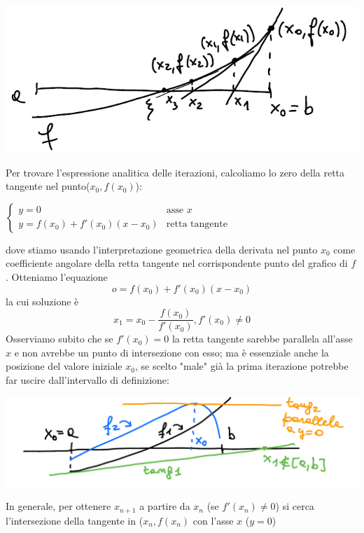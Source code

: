 \documentclass[12pt]{article}
\begin{document}
\begin{center}
    \includegraphics[scale=0.5]{pagina5_1.png}
\end{center}
Per trovare l'espressione analitica delle iterazioni, calcoliamo lo zero della retta tangente nel punto($x_0,f(x_0)$):
\begin{center}
    $\begin{cases}
        y = 0 &\mbox{asse } x\\
        y = f(x_0) + f'(x_0)(x-x_0) &\mbox{retta tangente}
    \end{cases}$
\end{center}
dove stiamo usando l'interpretazione geometrica della derivata nel punto $x_0$ come coefficiente angolare della retta tangente nel corrispondente punto del grafico di $f$. Otteniamo l'equazione 
\begin{equation*}
    o=f(x_0)+ f'(x_0)(x-x_0)
\end{equation*}
la cui soluzione è
\begin{equation*}
    x_1=x_0-\frac{f(x_0)}{f'(x_0)},f'(x_0)\neq 0
\end{equation*}
Osserviamo subito che se $f'(x_0)=0$ la retta tangente sarebbe parallela all'asse $x$ e non avrebbe un punto di intersezione con esso; ma è essenziale anche la posizione del valore iniziale $x_0$, se scelto "male" già la prima iterazione potrebbe far uscire dall'intervallo di definizione:\\
\begin{center}
    \includegraphics[scale=0.5]{pagina7.PNG}
\end{center}
In generale, per ottenere $x_{n+1}$ a partire da $x_n$ (se $f'(x_n)\neq 0$) si cerca l'intersezione della tangente in ($x_n,f(x_n)$ con l'asse $x$ ($y=0$)\\
\end{document}
